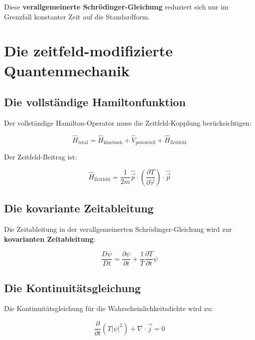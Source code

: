 \documentclass[12pt,a4paper]{report}
\begin{document}
	Diese \textbf{verallgemeinerte Schrödinger-Gleichung} reduziert sich nur im Grenzfall konstanter Zeit auf die Standardform.
	
	\section{Die zeitfeld-modifizierte Quantenmechanik}
	
	\subsection{Die vollständige Hamiltonfunktion}
	
	Der vollständige Hamilton-Operator muss die Zeitfeld-Kopplung berücksichtigen:
	
	\begin{equation}
		\hat{H}_{\text{total}} = \hat{H}_{\text{kinetisch}} + \hat{V}_{\text{potentiell}} + \hat{H}_{\text{Zeitfeld}}
	\end{equation}
	
	Der Zeitfeld-Beitrag ist:
	
	\begin{equation}
		\hat{H}_{\text{Zeitfeld}} = \frac{1}{2m}\hat{\vec{p}} \cdot \left(\frac{\partial T}{\partial \vec{r}}\right) \cdot \hat{\vec{p}}
	\end{equation}
	
	\subsection{Die kovariante Zeitableitung}
	
	Die Zeitableitung in der verallgemeinerten Schrödinger-Gleichung wird zur \textbf{kovarianten Zeitableitung}:
	
	\begin{equation}
		\frac{D\psi}{Dt} = \frac{\partial\psi}{\partial t} + \frac{1}{T}\frac{\partial T}{\partial t}\psi
	\end{equation}
	
	\subsection{Die Kontinuitätsgleichung}
	
	Die Kontinuitätsgleichung für die Wahrscheinlichkeitsdichte wird zu:
	
	\begin{equation}
		\frac{\partial}{\partial t}(T|\psi|^2) + \nabla \cdot \vec{j} = 0
	\end{equation}
	
\end{document}
